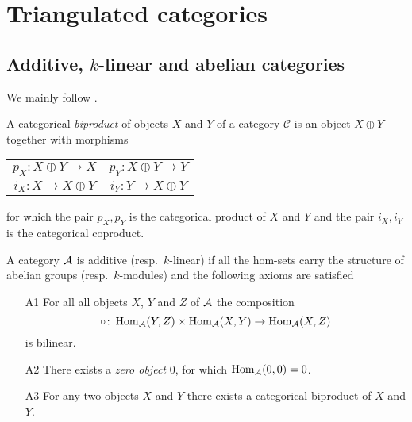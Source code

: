 \section{Triangulated categories}

\subsection{Additive, $k$-linear and abelian categories}

We mainly follow \cite{kashiwara2006categories}.

A categorical \emph{biproduct} of objects $X$ and $Y$ of a category $\mathcal C$ is an object $X \oplus Y$ together with morphisms
\begin{center}
    \begin{tabular}{c c}
        $p_X\colon X \oplus Y \to X$ & $p_Y\colon X \oplus Y \to Y$ \\
        $i_X\colon X \to X \oplus Y$ & $i_Y\colon Y \to X \oplus Y$ \\
    \end{tabular}
\end{center}
for which the pair $p_X, p_Y$ is the categorical product of $X$ and $Y$ and the pair $i_X, i_Y$ is the categorical coproduct.


\begin{definition}
    A category $\mathcal A$ is additive (resp.\ $k$-linear) if all the hom-sets carry the structure of abelian groups (resp.\ $k$-modules) and the following axioms are satisfied
    \begin{enumerate}
        \item[A1] For all all objects $X$, $Y$ and $Z$ of $\mathcal A$ the composition
        \[
            \circ \colon \operatorname{Hom}_{\mathcal A}(Y, Z) \times \operatorname{Hom}_{\mathcal A}(X, Y) \to \operatorname{Hom}_{\mathcal A}(X, Z)
        \] 
        is bilinear.
        \item[A2] There exists a \emph{zero object} $0$, for which $\operatorname{Hom}_\mathcal A(0,0) = 0$.
        \item[A3] For any two objects $X$ and $Y$ there exists a categorical biproduct of $X$ and $Y$. 
    \end{enumerate} 
\end{definition}


